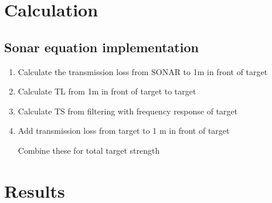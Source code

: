 \documentclass[11pt]{article}
\begin{document}

\section{Calculation}

\subsection*{Sonar equation implementation}
\begin{enumerate}
    \item Calculate the transmission loss from SONAR to 1m in front of target
    \item Calculate TL from 1m in front of target to target 
    \item Calculate TS from filtering with frequency response of target
    \item Add transmission loss from target to 1 m in front of target
    
    Combine these for total target strength
\end{enumerate}








\section{Results}

\end{document}
